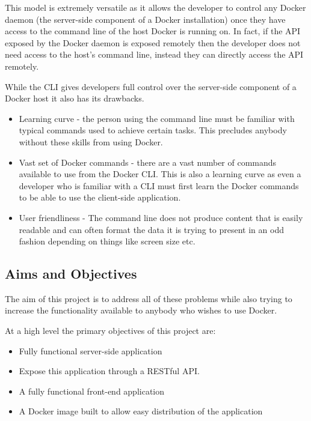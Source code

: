 This model is extremely versatile as it allows the developer to control any \gls{Docker daemon} (the server-side component of a Docker installation) once they have access to the command line of the host Docker is running on. In fact, if the API exposed by the Docker daemon is exposed remotely then the developer does not need access to the host's command line, instead they can directly access the API remotely.

While the \gls{CLI} gives developers full control over the server-side component of a \gls{Docker host} it also has its drawbacks.

\begin{itemize}
	\item Learning curve - the person using the command line must be familiar with typical commands used to achieve certain tasks. This precludes anybody without these skills from using Docker.
	\item Vast set of Docker commands - there are a vast number of commands available to use from the Docker CLI. This is also a learning curve as even a developer who is familiar with a CLI must first learn the Docker commands to be able to use the client-side application. 
	\item User friendliness - The command line does not produce content that is easily readable and can often format the data it is trying to present in an odd fashion depending on things like screen size etc.
\end{itemize}

\subsection{Aims and Objectives}
\label{sub:aims}
The aim of this project is to address all of these problems while also trying to increase the functionality available to anybody who wishes to use Docker.

At a high level the primary objectives of this project are:

\begin{itemize}
	\item Fully functional server-side application
	\item Expose this application through a \gls{REST}ful API.
	\item A fully functional front-end application
	\item A \gls{Docker image} built to allow easy distribution of the application
\end{itemize}

